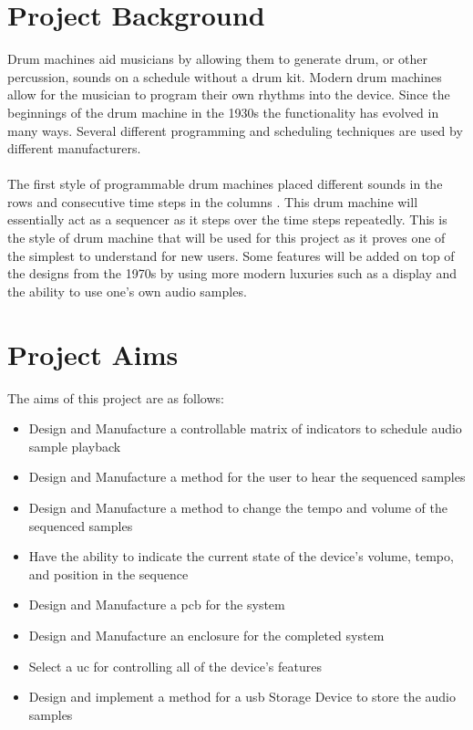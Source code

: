 \documentclass[12pt,a4paper]{report}
\begin{document}
\section{Project Background}
Drum machines aid musicians by allowing them to generate drum, or other percussion, sounds on a schedule without a drum kit. Modern drum machines allow for the musician to program their own rhythms into the device. Since the beginnings of the drum machine in the 1930s \cite{rhythmart} the functionality has evolved in many ways. Several different programming and scheduling techniques are used by different manufacturers. \\\\
The first style of programmable drum machines placed different sounds in the rows and consecutive time steps in the columns \cite{rhythmart, beatgoeson}. This drum machine will essentially act as a sequencer as it steps over the time steps repeatedly. This is the style of drum machine that will be used for this project as it proves one of the simplest to understand for new users. Some features will be added on top of the designs from the 1970s \cite{rhythmart, beatgoeson} by using more modern luxuries such as a display and the ability to use one's own audio samples.
\section{Project Aims} \label{sec:specs}
The aims of this project are as follows:
\begin{itemize}
	\setlength\itemsep{0em}
	\item Design and Manufacture a controllable matrix of indicators to schedule audio sample playback
	\item Design and Manufacture a method for the user to hear the sequenced samples
	\item Design and Manufacture a method to change the tempo and volume of the sequenced samples
	\item Have the ability to indicate the current state of the device's volume, tempo, and position in the sequence
	\item Design and Manufacture a \ac{pcb} for the system
	\item Design and Manufacture an enclosure for the completed system
	\item Select a \ac{uc} for controlling all of the device's features
	\item Design and implement a method for a \ac{usb} Storage Device to store the audio samples
\end{itemize}
\end{document}
